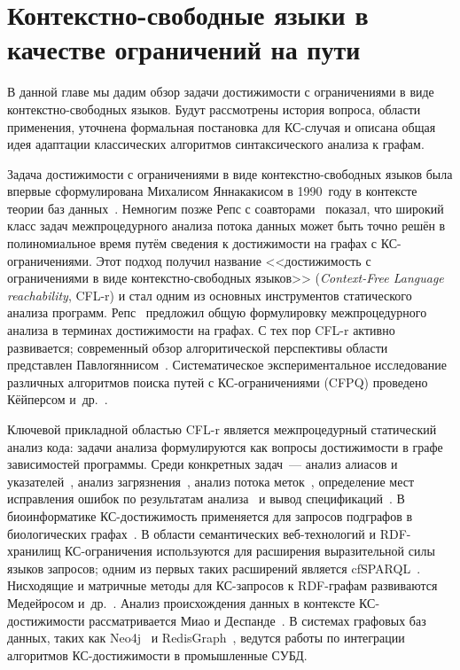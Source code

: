\section{Контекстно-свободные языки в качестве ограничений на пути}
	\label{sec:FLPQ_CFConstraints}


В данной главе мы дадим обзор задачи достижимости с ограничениями в виде контекстно-свободных языков.
Будут рассмотрены история вопроса, области применения, уточнена формальная постановка для КС-случая и описана общая идея адаптации классических алгоритмов синтаксического анализа к графам.



Задача достижимости с ограничениями в виде контекстно-свободных языков была впервые сформулирована Михалисом Яннакакисом в 1990~году в контексте теории баз данных~.
Немногим позже Репс с соавторами~ показал, что широкий класс задач межпроцедурного анализа потока данных может быть точно решён в полиномиальное время путём сведения к достижимости на графах с КС-ограничениями.
Этот подход получил название <<достижимость с ограничениями в виде контекстно-свободных языков>> (\emph{Context-Free Language reachability}, CFL-r) и стал одним из основных инструментов статического анализа программ.
Репс~ предложил общую формулировку межпроцедурного анализа в терминах достижимости на графах.
С тех пор CFL-r активно развивается; современный обзор алгоритической перспективы области представлен Павлогяннисом~.
Систематическое экспериментальное исследование различных алгоритмов поиска путей с КС-ограничениями (CFPQ) проведено Кёйперсом и~др.~.

Ключевой прикладной областью CFL-r является межпроцедурный статический анализ кода: задачи анализа формулируются как вопросы достижимости в графе зависимостей программы.
Среди конкретных задач~--- анализ алиасов и указателей~, анализ загрязнения~, анализ потока меток~, определение мест исправления ошибок по результатам анализа~ и вывод спецификаций~.
В биоинформатике КС-достижимость применяется для запросов подграфов в биологических графах~.
В области семантических веб-технологий и RDF-хранилищ КС-ограничения используются для расширения выразительной силы языков запросов; одним из первых таких расширений является cfSPARQL~.
Нисходящие и матричные методы для КС-запросов к RDF-графам развиваются Медейросом и~др.~.
Анализ происхождения данных в контексте КС-достижимости рассматривается Миао и Деспанде~.
В системах графовых баз данных, таких как Neo4j~ и RedisGraph~, ведутся работы по интеграции алгоритмов КС-достижимости в промышленные СУБД.


